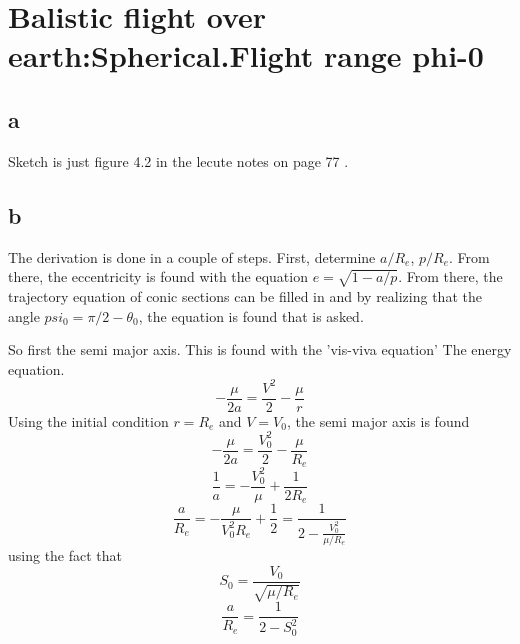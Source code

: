 \section{ Balistic flight over earth:Spherical.Flight range phi-0 }\label{sec:q4}    
\subsection{a}
Sketch is just figure 4.2 in the lecute notes on page 77 \cite{lectureNotes}.

\subsection{b}
The derivation is done in a couple of steps. First, determine $a/R_e$, $p/R_e$. From there, the eccentricity is found with the equation $e = \sqrt{1-a/p}$. From there, the trajectory equation of conic sections can be filled in and by realizing that the angle $psi_0=\pi/2-\theta_0$, the equation is found that is asked.

So first the semi major axis. This is found with the 'vis-viva equation' The energy equation.
\begin{equation}
-\frac{\mu}{2a}=\frac{V^2}{2}-\frac{\mu}{r}
\end{equation}
Using the initial condition $r=R_e$ and $V=V_0$, the semi major axis is found
\begin{equation}
-\frac{\mu}{2a}=\frac{V_0^2}{2}-\frac{\mu}{R_e}
\end{equation}
\begin{equation}
\frac{1}{a} = -\frac{V_0^2}{\mu}+\frac{1}{2R_e}
\end{equation}
\begin{equation}
\frac{a}{R_e} = -\frac{\mu}{V_0^2R_e}+\frac{1}{2}=\frac{1}{2-\frac{V_0^2}{\mu/R_e}}
\end{equation}
using the fact that 
\begin{equation}
S_0 = \frac{V_0}{\sqrt{\mu/R_e}}
\end{equation}
\begin{equation}
\frac{a}{R_e} =\frac{1}{2-S_0^2}
\end{equation}

